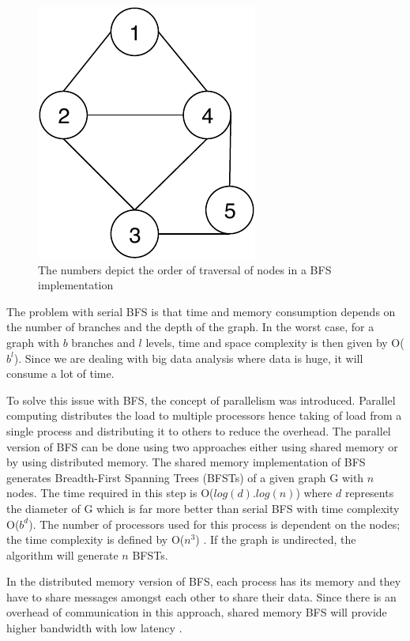 \documentclass[journal,twoside,web]{ieeecolor}
\begin{document}
\begin{figure}[!h]
    \centerline{\includegraphics[scale=1]{figures/bfs.pdf}}
    \caption{The numbers depict the order of traversal of nodes in a BFS implementation}
    \label{fig1}
\end{figure}

The problem with serial BFS is that time and memory consumption depends on the number of branches and the depth of the graph. In the worst case, for a graph with ${b}$ branches and ${l}$ levels, time and space complexity is then given by O($b^l$). Since we are dealing with big data analysis where data is huge, it will consume a lot of time.

To solve this issue with BFS, the concept of parallelism was introduced. Parallel computing distributes the load to multiple processors hence taking of load from a single process and distributing it to others to reduce the overhead. The parallel version of BFS can be done using two approaches either using shared memory or by using distributed memory. The shared memory implementation of BFS generates Breadth-First Spanning Trees (BFSTs) of a given graph G with $n$ nodes. The time required in this step is O($log(d).log(n)$) where $d$ represents the diameter of G which is far more better than serial BFS with time complexity O($b^d$). The number of processors used for this process is dependent on the nodes; the time complexity is defined by O($n^3$) \cite{36}. If the graph is undirected, the algorithm will generate $n$ BFSTs.

In the distributed memory version of BFS, each process has its memory and they have to share messages amongst each other to share their data. Since there is an overhead of communication in this approach, shared memory BFS will provide higher bandwidth with low latency \cite{37}.
\end{document}
